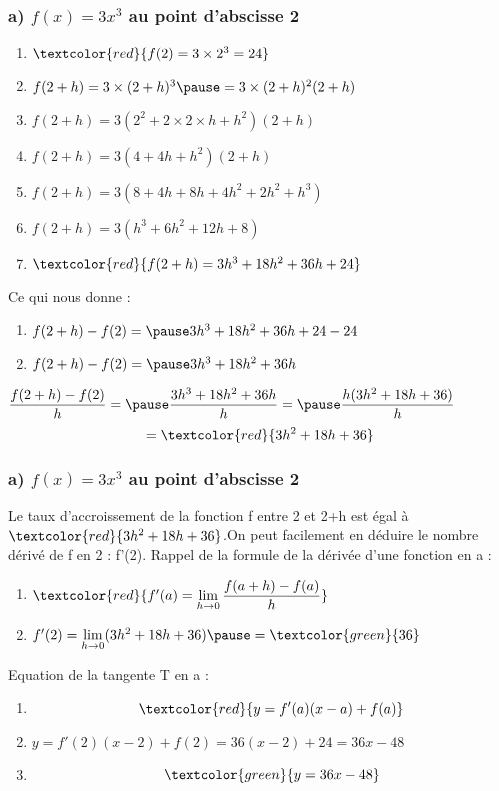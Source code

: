 \documentclass[t]{beamer}
\begin{document}
	\begin{frame}
		\frametitle{a) $f(x) = 3x^3$ au point d'abscisse 2}
		\pause
		\begin{enumerate}[]
			\item \(\textcolor{red}{f(2) =  3 \times 2^3 = 24}\)
			\pause
			\item \(f(2+h) =  3 \times (2+h)^3 \pause = 3 \times (2+h)^2(2+h) \)
			\pause
			\item \(f(2+h) = 3(2^2 + 2 \times 2 \times h + h^2)(2+h)\)
			\pause
			\item \(f(2+h) = 3(4 + 4h + h^2)(2+h)\)
			\pause
			\item \(f(2+h) = 3(8 + 4h + 8h + 4h^2 + 2h^2 + h^3)\)
			\pause
			\item \(f(2+h) = 3(h^3 + 6h^2 + 12h + 8)\)
			\pause
			\item \(\textcolor{red}{f(2+h) = 3h^3 + 18h^2 + 36h + 24}\)
			\pause
		\end{enumerate}
		\begin{block}{Ce qui nous donne :}
			\pause
			\begin{enumerate}[]
				\item \(f(2+h) - f(2) = \pause 3h^3 + 18h^2 + 36h + 24 - 24 \)
				\pause
				\item \(f(2+h) - f(2) = \pause 3h^3 + 18h^2 + 36h \)
			\end{enumerate}
		\end{block}
		\pause
		\( \dfrac{f(2+h) - f(2)}{h} = \pause \dfrac{3h^3 + 18h^2 + 36h}{h} = \pause \dfrac{h(3h^2 + 18h + 36)}{h}\)
		\pause
		\[=\textcolor{red}{3h^2 + 18h + 36}\]
	\end{frame}

	\begin{frame}
		\frametitle{a) $f(x) = 3x^3$ au point d'abscisse 2}
		\pause
		Le taux d'accroissement de la fonction f entre 2 et 2+h est égal à \pause $\textcolor{red}{3h^2 + 18h + 36}$.\pause On peut facilement en déduire le nombre dérivé de f \pause en 2 : f'(2).
		\pause
		Rappel de la formule de la dérivée d'une fonction en a : 
		\pause
		\begin{enumerate}[]
			\item<+-> \(\textcolor{red}{f'(a) = \lim\limits_{h \rightarrow 0}\dfrac{f(a+h)-f(a)}{h}}\)
			\item<+-> \(f'(2) = \lim\limits_{h \rightarrow 0} (3h^2 + 18h + 36) \pause = \textcolor{green}{36} \)
			\pause
		\end{enumerate}

		Equation de la tangente T en a :
		\pause
		\begin{enumerate}[]
			\item<+-> \[\textcolor{red}{y = f'(a)(x-a) + f(a)}\]
			\item<+-> \(y=f'(2)(x-2) + f(2) = 36(x-2) + 24 = 36x -48 \)
			\item<+-> \[\textcolor{green}{y = 36x -48} \]
		\end{enumerate}
	\end{frame}
\end{document}
